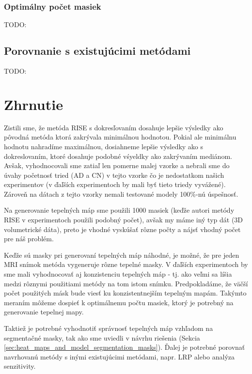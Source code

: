 \subsubsection{Optimálny počet masiek}

TODO:

\subsection{Porovnanie s existujúcimi metódami}

TODO:

\section{Zhrnutie}

Zistili sme, že metóda RISE s dokresľovaním dosahuje lepšie výsledky ako pôvodná metóda ktorá zakrývala minimálnou hodnotou. Pokial ale minimálnu hodnotu nahradíme maximálnou, dosiahneme lepšie výsledky ako s dokreslovaním, ktoré dosahuje podobné vśyeldky ako zakrývaním mediánom. Avšak, vyhodnocovali sme zatiaľ len pomerne malej vzorke a nebrali sme do úvahy početnosť tried (AD a CN) v tejto vzorke čo je nedostatkom našich experimentov (v ďaľších experimentoch by mali byť tieto triedy vyvážené). Zároveň na dátach z tejto vzorky nemali testované modely 100\%-nú úspešnosť.

Na generovanie tepelných máp sme použili 1000 masiek (keďže autori metódy RISE v experimentoch použili podobný počet), avšak my máme iný typ dát (3D volumetrické dáta), preto je vhodné vyskúšať rôzne počty a nájsť vhodný počet pre náš problém.

Keďže sú masky pri generovaní tepelných máp náhodné, je možné, že pre jeden MRI snímok metóda vygeneruje rôzne tepelné masky. V ďaľších experimentoch by sme mali vyhodnocovať aj konzistenciu tepelných máp - tj. ako veľmi sa líšia medzi rôznymi použitiami metódy na tom istom snímku. Predpokladáme, že väčší počet použitých másk bude viesť ku konzistentnejším tepelným mapám. Takýmto meraním môžeme dospieť k optimálnemu počtu masiek, ktorý je potrebný na generovanie tepelnej mapy.

Taktiež je potrebné vyhodnotiť správnosť tepelných máp vzhľadom na segmentačné masky, tak ako sme uviedli v návrhu riešenia (Sekcia \ref{sec:heat_maps_and_model_segmentation_masks}). Ďalej je potrebné porovnať navrhovanú metódy s inými existujúcimi metódami, napr. LRP alebo analýza senzitivity.


